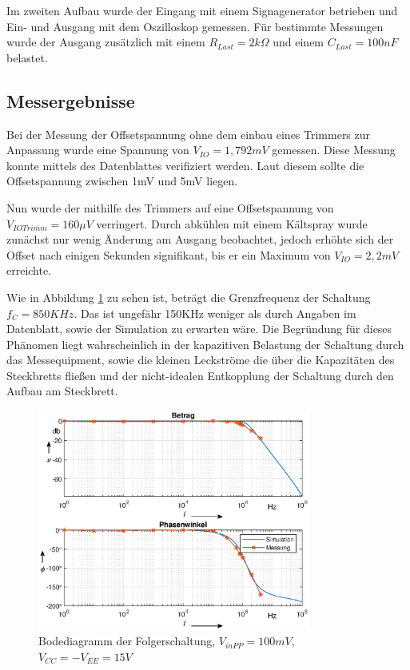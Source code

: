 Im zweiten Aufbau wurde der Eingang mit einem Signagenerator betrieben und Ein- und Ausgang mit dem Oszilloskop gemessen. Für bestimmte Messungen wurde der Ausgang zusätzlich mit einem $R_{Last} = 2k\Omega$ und einem $C_{Last} = 100nF$ belastet.


\subsection{Messergebnisse}
Bei der Messung der Offsetspannung ohne dem einbau eines Trimmers zur Anpassung wurde eine Spannung von $V_{IO} = 1,792 mV$ gemessen. Diese Messung konnte mittels des Datenblattes verifiziert werden. Laut diesem sollte die Offsetspannung zwischen 1mV und 5mV liegen.\cite[6]{ti:ua741}

Nun wurde der mithilfe des Trimmers auf eine Offsetspannung von $V_{IO Trimm} = 160 \mu V$ verringert. Durch abkühlen mit einem Kältspray wurde zunächst nur wenig Änderung am Ausgang beobachtet, jedoch erhöhte sich der Offset nach einigen Sekunden signifikant, bis er ein Maximum von $V_{IO} = 2,2mV$ erreichte. 

Wie in Abbildung \ref{fig:Bode_Folger_ua741} zu sehen ist, beträgt die Grenzfrequenz der Schaltung $f_C=850KHz$. Das ist ungefähr 150KHz weniger als durch Angaben im Datenblatt, sowie der Simulation zu erwarten wäre. Die Begründung für dieses Phänomen liegt wahrscheinlich in der kapazitiven Belastung der Schaltung durch das Messequipment, sowie die kleinen Leckströme die über die Kapazitäten des Steckbretts fließen und der nicht-idealen Entkopplung der Schaltung durch den Aufbau am Steckbrett. 


\begin{figure}[H]
    \centering
    \includegraphics[width=0.8\textwidth]{Lab_1/Plots/Folger.eps}
    \caption{Bodediagramm der Folgerschaltung, $V_{inPP}=100mV$, $V_{CC}=-V_{EE}=15V$}
    \label{fig:Bode_Folger_ua741}
\end{figure}

